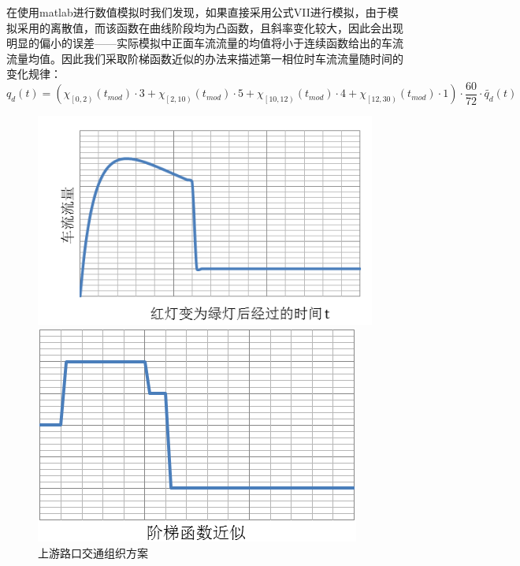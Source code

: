 \documentclass{cumcmart}
\begin{document}
在使用matlab进行数值模拟时我们发现，如果直接采用公式VII进行模拟，由于模拟采用的离散值，而该函数在曲线阶段均为凸函数，且斜率变化较大，因此会出现明显的偏小的误差------实际模拟中正面车流流量的均值将小于连续函数给出的车流流量均值。因此我们采取阶梯函数近似的办法来描述第一相位时车流流量随时间的变化规律：
\begin{equation}
q_{d}\left( t \right)=\left( \chi_{\left[ 0,2 \right)}\left( t_{mod}
\right)\cdot  3+\chi_{\left[ 2,10 \right)}\left( t_{mod} \right)\cdot
5+\chi_{\left[ 10,12 \right)}\left( t_{mod} \right)\cdot  4+\chi_{\left[
12,30 \right)}\left( t_{mod} \right)\cdot  1 \right)\cdot
\frac{60}{72}\cdot  \tilde{q_{d}}(t)
\end{equation}
\begin{figure}[h]
\centering
\begin{minipage}{.45\textwidth}
\centering
\includegraphics[width=.95\textwidth]{fig31}
\end{minipage}\hfill
\begin{minipage}{.45\textwidth}
\centering
\includegraphics[width=.8\textwidth]{fig32}
\end{minipage}
\caption{上游路口交通组织方案}
\end{figure}
\end{document}
